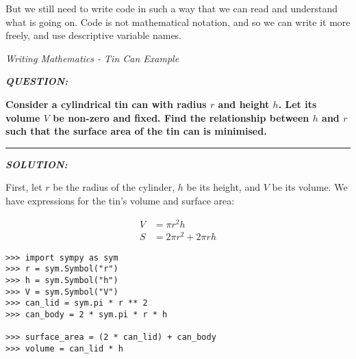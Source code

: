 \documentclass[12pt]{article}
\begin{document}
\vspace{15mm}

\begin{center}

\end{center}

\vspace{15mm}

But we still need to write code in such a way that we can read and understand what is going on. Code is not mathematical notation, and so we can write it more freely, and use descriptive variable names.

\newpage

\begin{center}
\LARGE{\textit{Writing Mathematics - Tin Can Example}}
\end{center}

\vspace{15mm}

\textbf{\textit{QUESTION:}}

\textbf{Consider a cylindrical tin can with radius $r$ and height $h$. Let its volume $V$ be non-zero and fixed. Find the relationship between $h$ and $r$ such that the surface area of the tin can is minimised.}

\vspace{5mm}
\hrule
\vspace{5mm}

\textbf{\textit{SOLUTION:}}

\vspace{5mm}

\begin{mdframed}[linewidth=0.5mm, backgroundcolor=orange!10]
First, let $r$ be the radius of the cylinder, $h$ be its height, and $V$ be its volume. We have expressions for the tin's volume and surface area:
\end{mdframed}

\begin{minipage}[t]{.37\textwidth} %
\begin{mdframed}[linewidth=0.5mm, backgroundcolor=cyan!10]
\begin{align*}
V &= \pi r^2 h \\
S &= 2\pi r^2 + 2 \pi rh
\end{align*}
\vspace{1.8cm}
\end{mdframed}
\end{minipage} %
\begin{minipage}[t]{.63\textwidth} %
\begin{verbatim}
>>> import sympy as sym
>>> r = sym.Symbol("r")
>>> h = sym.Symbol("h")
>>> V = sym.Symbol("V")
>>> can_lid = sym.pi * r ** 2
>>> can_body = 2 * sym.pi * r * h

>>> surface_area = (2 * can_lid) + can_body
>>> volume = can_lid * h
\end{verbatim}
\end{minipage}
\end{document}
